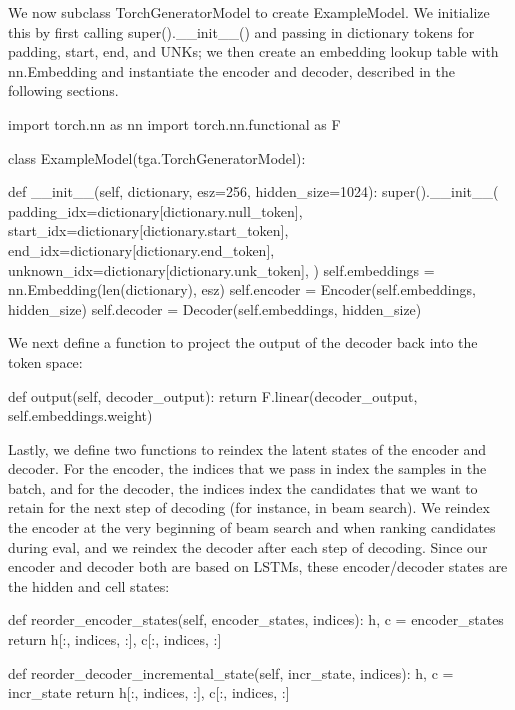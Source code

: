 We now subclass {\ttfamily Torch\+Generator\+Model} to create {\ttfamily Example\+Model}. We initialize this by first calling {\ttfamily super().\+\_\+\+\_\+init\+\_\+\+\_\+()} and passing in dictionary tokens for padding, start, end, and U\+N\+Ks; we then create an embedding lookup table with {\ttfamily nn.\+Embedding} and instantiate the encoder and decoder, described in the following sections.


\begin{DoxyCode}
import torch.nn as nn
import torch.nn.functional as F

class ExampleModel(tga.TorchGeneratorModel):

    def \_\_init\_\_(self, dictionary, esz=256, hidden\_size=1024):
        super().\_\_init\_\_(
            padding\_idx=dictionary[dictionary.null\_token],
            start\_idx=dictionary[dictionary.start\_token],
            end\_idx=dictionary[dictionary.end\_token],
            unknown\_idx=dictionary[dictionary.unk\_token],
        )
        self.embeddings = nn.Embedding(len(dictionary), esz)
        self.encoder = Encoder(self.embeddings, hidden\_size)
        self.decoder = Decoder(self.embeddings, hidden\_size)
\end{DoxyCode}


We next define a function to project the output of the decoder back into the token space\+:


\begin{DoxyCode}
def output(self, decoder\_output):
    return F.linear(decoder\_output, self.embeddings.weight)
\end{DoxyCode}


Lastly, we define two functions to reindex the latent states of the encoder and decoder. For the encoder, the indices that we pass in index the samples in the batch, and for the decoder, the indices index the candidates that we want to retain for the next step of decoding (for instance, in beam search). We reindex the encoder at the very beginning of beam search and when ranking candidates during eval, and we reindex the decoder after each step of decoding. Since our encoder and decoder both are based on L\+S\+T\+Ms, these encoder/decoder states are the hidden and cell states\+: 
\begin{DoxyCode}
def reorder\_encoder\_states(self, encoder\_states, indices):
    h, c = encoder\_states
    return h[:, indices, :], c[:, indices, :]

def reorder\_decoder\_incremental\_state(self, incr\_state, indices):
    h, c = incr\_state
    return h[:, indices, :], c[:, indices, :]
\end{DoxyCode}


